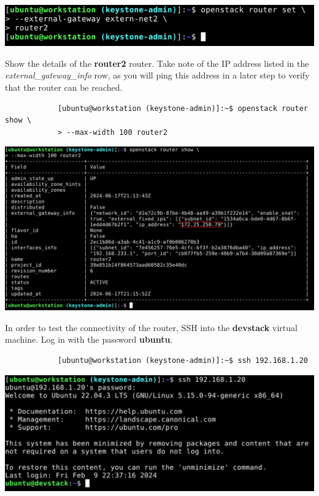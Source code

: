 \documentclass[letterpaper, 12pt]{article}
\begin{document}
\begin{enumerate}
\begin{labstep}
        \begin{center}
            \includegraphics[width=\linewidth]{images/part2/step14.png}
        \end{center}
    \end{labstep}

    \begin{labstep}
        Show the details of the \textbf{router2} router.
        Take note of the IP address listed in the \textit{external\_gateway\_info} row, as you will ping this address in a later step to verify that the router can be reached.
        \begin{lstlisting}
            [ubuntu@workstation (keystone-admin)]:~$ openstack router show \
            > --max-width 100 router2
        \end{lstlisting}

        \begin{center}
            \includegraphics[width=\linewidth]{images/part2/step15.png}
        \end{center}
    \end{labstep}

    \begin{labstep}
        In order to test the connectivity of the router, SSH into the \textbf{devstack} virtual machine.
        Log in with the password \textbf{ubuntu}.
        \begin{lstlisting}
            [ubuntu@workstation (keystone-admin)]:~$ ssh 192.168.1.20
        \end{lstlisting}

        \begin{center}
            \includegraphics[width=\linewidth]{images/part2/step16.png}
        \end{center}
    \end{labstep}


\end{enumerate}
\end{document}
